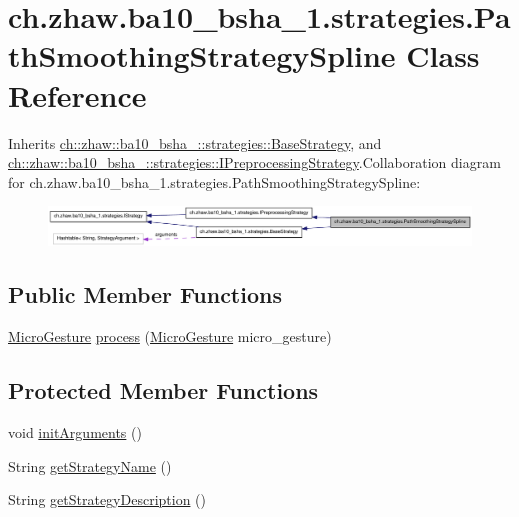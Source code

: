 \hypertarget{classch_1_1zhaw_1_1ba10__bsha__1_1_1strategies_1_1PathSmoothingStrategySpline}{
\section{ch.zhaw.ba10\_\-bsha\_\-1.strategies.PathSmoothingStrategySpline Class Reference}
\label{classch_1_1zhaw_1_1ba10__bsha__1_1_1strategies_1_1PathSmoothingStrategySpline}
}


Inherits \hyperlink{classch_1_1zhaw_1_1ba10__bsha__1_1_1strategies_1_1BaseStrategy}{ch::zhaw::ba10\_\-bsha\_::strategies::BaseStrategy}, and \hyperlink{interfacech_1_1zhaw_1_1ba10__bsha__1_1_1strategies_1_1IPreprocessingStrategy}{ch::zhaw::ba10\_\-bsha\_::strategies::IPreprocessingStrategy}.Collaboration diagram for ch.zhaw.ba10\_\-bsha\_\-1.strategies.PathSmoothingStrategySpline:\nopagebreak
\begin{figure}[H]
\begin{center}
\leavevmode
\includegraphics[width=400pt]{classch_1_1zhaw_1_1ba10__bsha__1_1_1strategies_1_1PathSmoothingStrategySpline__coll__graph}
\end{center}
\end{figure}
\subsection*{Public Member Functions}
\begin{DoxyCompactItemize}
\item 
\hyperlink{classch_1_1zhaw_1_1ba10__bsha__1_1_1service_1_1MicroGesture}{MicroGesture} \hyperlink{classch_1_1zhaw_1_1ba10__bsha__1_1_1strategies_1_1PathSmoothingStrategySpline_ad3e6346b66b88e50ce7c985ff3d99644}{process} (\hyperlink{classch_1_1zhaw_1_1ba10__bsha__1_1_1service_1_1MicroGesture}{MicroGesture} micro\_\-gesture)
\end{DoxyCompactItemize}
\subsection*{Protected Member Functions}
\begin{DoxyCompactItemize}
\item 
void \hyperlink{classch_1_1zhaw_1_1ba10__bsha__1_1_1strategies_1_1PathSmoothingStrategySpline_aa3b240dfbae6e57c599c82a7542c0802}{initArguments} ()
\item 
String \hyperlink{classch_1_1zhaw_1_1ba10__bsha__1_1_1strategies_1_1PathSmoothingStrategySpline_a1a91b60b6a706bc2365bc2ae9ab727af}{getStrategyName} ()
\item 
String \hyperlink{classch_1_1zhaw_1_1ba10__bsha__1_1_1strategies_1_1PathSmoothingStrategySpline_a5ee7b3c0a4ad6cc7ae5aec7feeda34df}{getStrategyDescription} ()
\end{DoxyCompactItemize}

